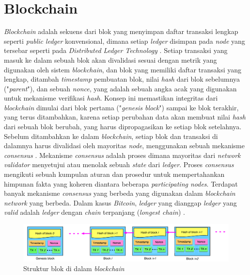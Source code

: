 \section{Blockchain}
\label{sec:blockchain}

\textit{Blockchain} adalah sekuens dari blok yang menyimpan daftar transaksi lengkap seperti \textit{public ledger} konvensional, dimana setiap \textit{ledger} disimpan pada \textit{node} yang tersebar seperti pada \textit{Distributed Ledger Technology} \parencite{zheng2018blockchain}. Setiap transaksi yang masuk ke dalam sebuah blok akan divalidasi sesuai dengan metrik yang digunakan oleh sistem \textit{blockchain}, dan blok yang memiliki daftar transaksi yang lengkap, ditambah \textit{timestamp} pembuatan blok, nilai \textit{hash} dari blok sebelumnya ("\textit{parent}"), dan sebuah \textit{nonce}, yang adalah sebuah angka acak yang digunakan untuk mekanisme verifikasi \textit{hash}. Konsep ini memastikan integritas dari \textit{blockchain} dimulai dari blok pertama ("\textit{genesis block}") sampai ke blok terakhir, yang terus ditambahkan, karena setiap perubahan data akan membuat nilai \textit{hash} dari sebuah blok berubah, yang harus dipropagasikan ke setiap blok setelahnya. Sebelum ditambahkan ke dalam \textit{blockchain}, setiap blok dan transaksi di dalamnya harus divalidasi oleh mayoritas \textit{node}, menggunakan sebuah mekanisme \textit{consensus} \parencite{nofer2017blockchain}. Mekanisme \textit{consensus} adalah proses dimana mayoritas dari \textit{network validator} menyetujui atau menolak sebuah \textit{state} dari \textit{ledger}. Proses \textit{consensus} mengikuti sebuah kumpulan aturan dan prosedur untuk mempertahankan himpunan fakta yang koheren diantara beberapa \textit{participating nodes}. Terdapat banyak mekanisme \textit{consensus} yang berbeda yang digunakan dalam \textit{blockchain network} yang berbeda. Dalam kasus \textit{Bitcoin}, \textit{ledger} yang dianggap \textit{ledger} yang \textit{valid} adalah \textit{ledger} dengan \textit{chain} terpanjang (\textit{longest chain}) \parencite{swanson2015consensus}.

\begin{figure}[ht]
	\centering
	\includegraphics[width=1\textwidth]{resources/chapter-2/struktur-blockchain.png}
	\caption{Struktur blok di dalam \textit{blockchain} \parencite{zheng2018blockchain}}
	\label{image:struktur-blockchain}
\end{figure}

